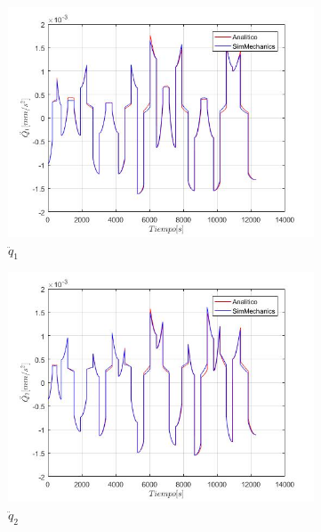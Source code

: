 \begin{figure}
    \centering
    \begin{subfigure}{0.45\textwidth}
        \includegraphics[width=\linewidth]{Cap4_DisenoBasico/Figura/ComparativoSimMechanics/QPPunto1.jpg}
        \caption{$\ddot{q}_1$}
    \end{subfigure}
    \begin{subfigure}{0.45\textwidth}
        \includegraphics[width=\linewidth]{Cap4_DisenoBasico/Figura/ComparativoSimMechanics/QPPunto2.jpg}
        \caption{$\ddot{q}_2$}
    \end{subfigure}
    \begin{subfigure}{0.45\textwidth}

\end{subfigure}
\end{figure}
